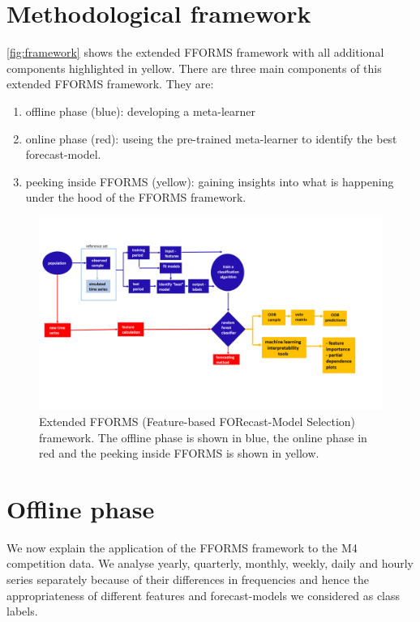 \documentclass[11pt,a4paper,]{article}
\providecommand{\tightlist}{%
  \setlength{\itemsep}{0pt}\setlength{\parskip}{0pt}}
\begin{document}
\hypertarget{fforms}{%
\section{Methodological framework}\label{fforms}}

\autoref{fig:framework} shows the extended FFORMS framework with all additional components highlighted in yellow. There are three main components of this extended FFORMS framework. They are:

\begin{enumerate}
\def\labelenumi{\arabic{enumi}.}
\tightlist
\item
  offline phase (blue): developing a meta-learner
\item
  online phase (red): useing the pre-trained meta-learner to identify the best forecast-model.
\item
  peeking inside FFORMS (yellow): gaining insights into what is happening under the hood of the FFORMS framework.
\end{enumerate}

\begin{figure}[h]
\includegraphics[width=1.1\linewidth]{img/framework2} \caption{Extended FFORMS (Feature-based FORecast-Model Selection) framework. The offline phase is shown in blue, the online phase in red and the peeking inside FFORMS is shown in yellow.}\label{fig:framework}
\end{figure}

\hypertarget{offline}{%
\section{Offline phase}\label{offline}}

We now explain the application of the FFORMS framework to the M4 competition data. We analyse yearly, quarterly, monthly, weekly, daily and hourly series separately because of their differences in frequencies and hence the appropriateness of different features and forecast-models we considered as class labels.
\end{document}
